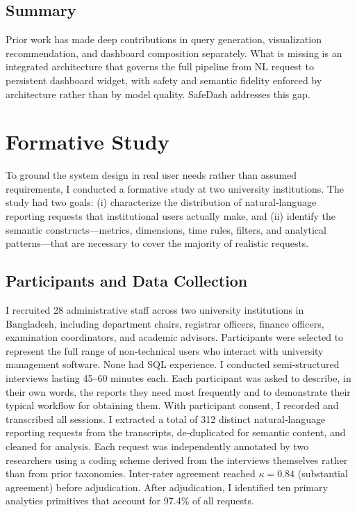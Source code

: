 \documentclass[11pt]{article}
\begin{document}
\subsection{Summary}
Prior work has made deep contributions in query generation, visualization recommendation, and dashboard composition separately. What is missing is an integrated architecture that governs the full pipeline from NL request to persistent dashboard widget, with safety and semantic fidelity enforced by architecture rather than by model quality. SafeDash addresses this gap.

\section{Formative Study\label{sec:formative}}
To ground the system design in real user needs rather than assumed requirements, I conducted a formative study at two university institutions. The study had two goals: (i) characterize the distribution of natural‑language reporting requests that institutional users actually make, and (ii) identify the semantic constructs—metrics, dimensions, time rules, filters, and analytical patterns—that are necessary to cover the majority of realistic requests.

\subsection{Participants and Data Collection}
I recruited 28 administrative staff across two university institutions in Bangladesh, including department chairs, registrar officers, finance officers, examination coordinators, and academic advisors. Participants were selected to represent the full range of non‑technical users who interact with university management software. None had SQL experience. I conducted semi‑structured interviews lasting 45–60 minutes each. Each participant was asked to describe, in their own words, the reports they need most frequently and to demonstrate their typical workflow for obtaining them. With participant consent, I recorded and transcribed all sessions. I extracted a total of 312 distinct natural‑language reporting requests from the transcripts, de‑duplicated for semantic content, and cleaned for analysis. Each request was independently annotated by two researchers using a coding scheme derived from the interviews themselves rather than from prior taxonomies. Inter‑rater agreement reached $\kappa = 0.84$ (substantial agreement) before adjudication. After adjudication, I identified ten primary analytics primitives that account for 97.4\% of all requests.
\end{document}
